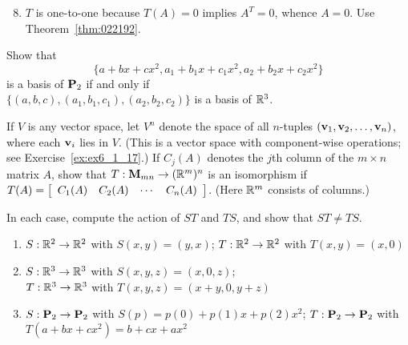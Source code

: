 \begin{multicols}{2}
\begin{ex}
\begin{sol}
\begin{enumerate}[label={\alph*.}]
\setcounter{enumi}{7}
\item $T$ is one-to-one because $T(A) = 0$ implies $A^{T} = 0$, whence $A = 0$. Use Theorem~\ref{thm:022192}.

\end{enumerate}
\end{sol}
\end{ex}

\begin{ex}
Show that 
\begin{equation*}
\{a + bx + cx^{2}, a_{1} + b_{1}x + c_{1}x^{2}, a_{2} + b_{2}x + c_{2}x^{2}\}
\end{equation*}
is a basis of $\textbf{P}_{2}$ if and only if \\ $\{(a, b, c), (a_{1}, b_{1}, c_{1}), (a_{2}, b_{2}, c_{2})\}$ is a basis of $\mathbb{R}^3$.
\end{ex}

\begin{ex}
If $V$ is any vector space, let $V^{n}$ denote the space of all $n$-tuples $(\textbf{v}_{1}, \textbf{v}_{2}, \dots, \textbf{v}_{n})$, where each $\textbf{v}_{i}$ lies in $V$. (This is a vector space with component-wise operations; see Exercise~\ref{ex:ex6_1_17}.) If $C_{j}(A)$ denotes the $j$th column of the $m \times n$ matrix $A$, show that $T : \textbf{M}_{mn} \to (\mathbb{R}^m)^{n}$ is an isomorphism if \\ $T(A) = \left[ \begin{array}{cccc}
C_{1}(A) & C_{2}(A) & \cdots & C_{n}(A)
\end{array} \right]$. (Here $\mathbb{R}^m$ consists of columns.)
\end{ex}

\columnbreak
\begin{ex}
In each case, compute the action of $ST$ and $TS$, and show that $ST \neq TS$.


\begin{enumerate}[label={\alph*.}]
\item $S : \mathbb{R}^2 \to \mathbb{R}^2$ with $S(x, y) = (y, x)$; $T : \mathbb{R}^2 \to \mathbb{R}^2$ with $T(x, y) = (x, 0)$

\item $S : \mathbb{R}^3 \to \mathbb{R}^3$ with $S(x, y, z) = (x, 0, z)$; \\ $T : \mathbb{R}^3 \to \mathbb{R}^3$ with $T(x, y, z) = (x + y, 0, y + z)$

\item $S : \textbf{P}_{2} \to \textbf{P}_{2}$ with $S(p) = p(0) + p(1)x + p(2)x^{2}$; $T : \textbf{P}_{2} \to \textbf{P}_{2}$ with $T(a + bx + cx^{2}) = b + cx + ax^{2}$


\end{enumerate}
\end{ex}
\end{multicols}
